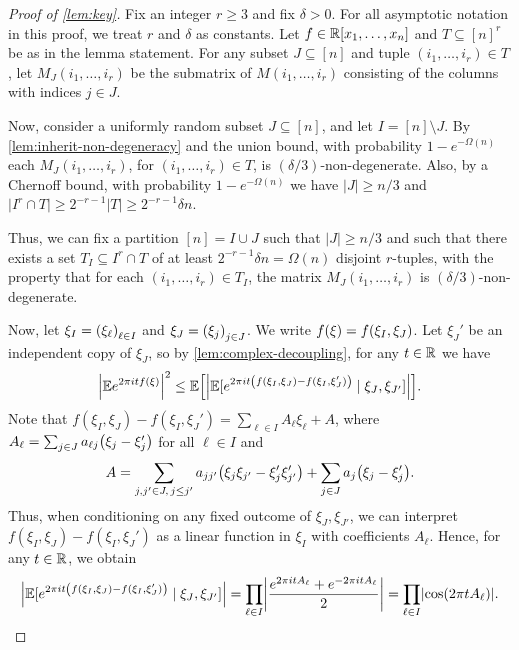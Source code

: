 \documentclass{daj}
\theoremstyle{plain}
\theoremstyle{plain}
\theoremstyle{plain}
\theoremstyle{plain}
\theoremstyle{definition}
\theoremstyle{plain}
\theoremstyle{plain}
\theoremstyle{definition}
\theoremstyle{definition}
\theoremstyle{plain}
\let\originalleft\left
\let\originalright\right
\renewcommand{\left}{\mathopen{}\mathclose\bgroup\originalleft}
\renewcommand{\right}{\aftergroup\egroup\originalright}
\begin{document}
\begin{proof}
[Proof of \cref{lem:key}]
Fix an integer $r\geq 3$ and fix $\delta> 0$. For all asymptotic notation in this proof, we treat $r$ and $\delta$ as constants. Let $f\in \mathbb{R}[x_1,\dots,x_n]$ and $T\subseteq [n]^r$ be as in the lemma statement. For any subset $J \subseteq [n]$ and tuple
$(i_{1},\dots,i_{r})\in T$, let $M_{J}(i_{1},\dots,i_{r})$ be
the submatrix of $M(i_{1},\dots,i_{r})$ consisting of the columns with indices $j\in J$.

Now, consider a uniformly random subset $J\subseteq [n]$, and let $I=[n]\setminus J$. By \cref{lem:inherit-non-degeneracy} and the union bound, with probability $1-e^{-\Omega(n)}$ each $M_{J}(i_{1},\dots,i_{r})$, for $(i_1,\dots,i_r)\in T$, is $(\delta/3)$-non-degenerate. Also, by a Chernoff bound, with probability $1-e^{-\Omega(n)}$ we have $\vert J\vert\geq n/3$ and $\vert I^r\cap T\vert\geq 2^{-r-1}\vert T\vert\geq 2^{-r-1}\delta n$.

Thus, we can fix a partition $[n]=I\cup J$ such that $\vert J\vert\geq n/3$ and such that there exists a set $T_{I}\subseteq  I^{r}\cap T$ of at least $2^{-r-1}\delta n=\Omega(n)$ disjoint $r$-tuples, with the property that for each $(i_{1},\dots,i_{r})\in T_{I}$, the matrix $M_{J}(i_{1},\dots,i_{r})$ is $(\delta/3)$-non-degenerate.

Now, let $\xi_{I}=\left(\xi_{\ell}\right)_{\ell\in I}$ and $\xi_{J}=\left(\xi_{j}\right)_{j\in J}$. We write $f\left(\xi\right)=f(\xi_I, \xi_J)$. Let $\xi_{J}'$ be an independent copy of $\xi_{J}$, so by \cref{lem:complex-decoupling}, for any $t\in \mathbb{R}$ we have
\begin{equation}\label{eq:decoupled}
\left|\E e^{2\pi itf(\xi)}\right|^{2}\le\E\left[\left|\E[e^{2\pi it\left(f(\xi_{I},\xi_{J})-f(\xi_{I},\xi_{J}')\right)}\mid \xi_{J},\xi_{J'}]\right|\right].
\end{equation}
Note that $f(\xi_{I},\xi_{J})-f(\xi_{I},\xi_{J}')=\sum_{\ell\in I}A_{\ell}\xi_{\ell}+A$, where $A_{\ell}=\sum_{j\in J}a_{\ell j}\left(\xi_{j}-\xi_{j}'\right)$ for all $\ell\in I$ and
\[
A=\sum_{j,j'\in J,\,j\le j'}a_{jj'}\left(\xi_j\xi_{j'}-\xi_j'\xi_{j'}'\right)+\sum_{j\in J}a_{j}\left(\xi_{j}-\xi_{j}'\right).
\]
Thus, when conditioning on any fixed outcome of $\xi_{J},\xi_{J'}$, we can interpret $f(\xi_{I},\xi_{J})-f(\xi_{I},\xi_{J}')$ as a linear function in $\xi_I$ with coefficients $A_\ell$. Hence, for any $t\in \mathbb{R}$, we obtain
\begin{equation}\label{eq:cos}
\left|\E[e^{2\pi it\left(f(\xi_{I},\xi_{J})-f(\xi_{I},\xi_{J}')\right)}\mid \xi_{J},\xi_{J'}]\right|=\prod_{\ell\in I}\left|\frac{e^{2\pi itA_{\ell}}+e^{-2\pi itA_{\ell}}}{2}\right|
 =\prod_{\ell\in I}\left|\cos\left(2\pi tA_{\ell}\right)\right|.
\end{equation}


\end{proof}
\end{document}
